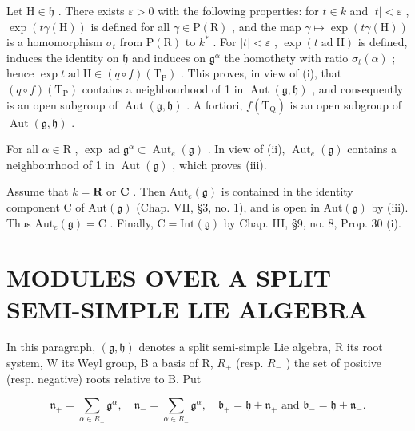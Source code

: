 Let \(\mathrm{H} \in \mathfrak{h}\) . There exists \(\varepsilon > 0\) with the following properties: for \(t \in k\) and \(|t| < \varepsilon\) , \(\exp(t\gamma(\mathrm{H}))\) is defined for all \(\gamma \in \mathrm{P}(\mathrm{R})\) , and the map \(\gamma \mapsto \exp(t\gamma(\mathrm{H}))\) is a homomorphism \(\sigma_t\) from \(\mathrm{P}(\mathrm{R})\) to \(k^*\) . For \(|t| < \varepsilon\) , \(\exp(t\operatorname{ad}\mathrm{H})\) is defined, induces the identity on \(\mathfrak{h}\) and induces on \(\mathfrak{g}^\alpha\) the homothety with ratio \(\sigma_t(\alpha)\) ; hence \(\exp t\operatorname{ad}\mathrm{H} \in (q \circ f)(\mathrm{T}_{\mathrm{P}})\) . This proves, in view of (i), that \((q \circ f)(\mathrm{T}_{\mathrm{P}})\) contains a neighbourhood of 1 in \(\operatorname{Aut}(\mathfrak{g},\mathfrak{h})\) , and consequently is an open subgroup of \(\operatorname{Aut}(\mathfrak{g},\mathfrak{h})\) . A fortiori, \(f(\mathrm{T}_{\mathrm{Q}})\) is an open subgroup of \(\operatorname{Aut}(\mathfrak{g},\mathfrak{h})\) .

For all \(\alpha \in \mathrm{R}\) , \(\exp \operatorname{ad} \mathfrak{g}^{\alpha} \subset \operatorname{Aut}_{e}(\mathfrak{g})\) . In view of (ii), \(\operatorname{Aut}_{e}(\mathfrak{g})\) contains a neighbourhood of 1 in \(\operatorname{Aut}(\mathfrak{g})\) , which proves (iii).

Assume that \(k = \mathbf{R}\) or \(\mathbf{C}\) . Then \(\mathrm{Aut}_e(\mathfrak{g})\) is contained in the identity component \(\mathrm{C}\) of \(\mathrm{Aut}(\mathfrak{g})\) (Chap. VII, §3, no. 1), and is open in \(\mathrm{Aut}(\mathfrak{g})\) by (iii). Thus \(\mathrm{Aut}_e(\mathfrak{g}) = \mathrm{C}\) . Finally, \(\mathrm{C} = \mathrm{Int}(\mathfrak{g})\) by Chap. III, §9, no. 8, Prop. 30 (i).

\section{MODULES OVER A SPLIT SEMI-SIMPLE LIE ALGEBRA}

In this paragraph, \((\mathfrak{g},\mathfrak{h})\) denotes a split semi-simple Lie algebra, R its root system, W its Weyl group, B a basis of R, \(R_{+}\) (resp. \(R_{-}\) ) the set of positive (resp. negative) roots relative to B. Put

\[
\mathfrak {n} _ {+} = \sum_ {\alpha \in R _ {+}} \mathfrak {g} ^ {\alpha}, \quad \mathfrak {n} _ {-} = \sum_ {\alpha \in R _ {-}} \mathfrak {g} ^ {\alpha}, \quad \mathfrak {b} _ {+} = \mathfrak {h} + \mathfrak {n} _ {+} \text {   and   } \mathfrak {b} _ {-} = \mathfrak {h} + \mathfrak {n} _ {-}.
\]

